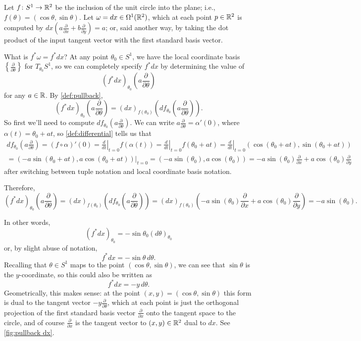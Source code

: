 \begin{example}
	Let $f \colon\thinspace\! S^1 \to \mathbb{R}^2$ be the inclusion of the unit circle into the plane; i.e., $f(\theta) = (\cos \theta , \sin \theta)$. Let $\omega = dx \in \Omega^1(\mathbb{R}^2)$, which at each point $p \in \mathbb{R}^2$ is computed by $dx\left(a \frac{\partial}{\partial x} + b \frac{\partial}{\partial y}\right) = a$; or, said another way, by taking the dot product of the input tangent vector with the first standard basis vector.
	
	What is $f^\ast \omega = f^\ast dx$? At any point $\theta_0 \in S^1$, we have the local coordinate basis $\left\{ \frac{\partial}{\partial \theta}\right\}$ for $T_{\theta_0}S^1$, so we can completely specify $f^\ast dx$ by determining the value of
	\[
		(f^\ast dx)_{\theta_0}\left( a \frac{\partial}{\partial \theta}\right)
	\]
	for any $a \in \mathbb{R}$. By \cref{def:pullback},
	\[
		(f^\ast dx)_{\theta_0}\left( a \frac{\partial}{\partial \theta}\right) = (dx)_{f(\theta_0)}\left(df_{\theta_0}\left( a \frac{\partial}{\partial \theta}\right)\right).
	\]
	So first we'll need to compute $df_{\theta_0}\left( a \frac{\partial}{\partial \theta}\right)$. We can write $a \frac{\partial}{\partial \theta} = \alpha'(0)$, where $\alpha(t) = \theta_0 + a t$, so \cref{def:differential} tells us that
	\begin{multline*}
		df_{\theta_0}\left( a \frac{\partial}{\partial \theta}\right) = (f \circ \alpha)'(0) = \left. \frac{d}{dt} \right|_{t=0} f(\alpha(t)) = \left. \frac{d}{dt} \right|_{t=0} f(\theta_0 + at) = \left. \frac{d}{dt} \right|_{t=0} (\cos(\theta_0 + at), \sin(\theta_0 + at)) \\
		= \left. (-a\sin(\theta_0 + at),a \cos(\theta_0 + at))\right|_{t=0} = (-a \sin(\theta_0), a \cos(\theta_0)) = -a \sin(\theta_0) \frac{\partial}{\partial x} + a \cos(\theta_0) \frac{\partial}{\partial y}
	\end{multline*}
	after switching between tuple notation and local coordinate basis notation. 
	
	Therefore,
	\[
		(f^\ast dx)_{\theta_0}\left( a \frac{\partial}{\partial \theta}\right) = (dx)_{f(\theta_0)}\left(df_{\theta_0}\left( a \frac{\partial}{\partial \theta}\right)\right) = (dx)_{f(\theta_0)}\left(-a \sin(\theta_0) \frac{\partial}{\partial x} + a \cos(\theta_0) \frac{\partial}{\partial y}\right) = -a \sin(\theta_0).
	\]
	
	In other words,
	\[
		(f^\ast dx)_{\theta_0} = -\sin\theta_0 (d\theta)_{\theta_0}
	\]
	or, by slight abuse of notation,
	\[
		f^\ast dx = -\sin \theta \, d\theta.
	\]
	Recalling that $\theta \in S^1$ maps to the point $(\cos \theta, \sin \theta)$, we can see that $\sin \theta$ is the $y$-coordinate, so this could also be written as
	\[
		f^\ast dx = -y \, d\theta.
	\]
	Geometrically, this makes sense: at the point $(x,y) = (\cos \theta, \sin \theta)$ this form is dual to the tangent vector $-y \frac{\partial}{\partial \theta}$, which at each point is just the orthogonal projection of the first standard basis vector $\frac{\partial}{\partial x}$ onto the tangent space to the circle, and of course $\frac{\partial}{\partial x}$ is the tangent vector to $(x,y) \in \mathbb{R}^2$ dual to $dx$. See \cref{fig:pullback dx}.
	

\end{example}
